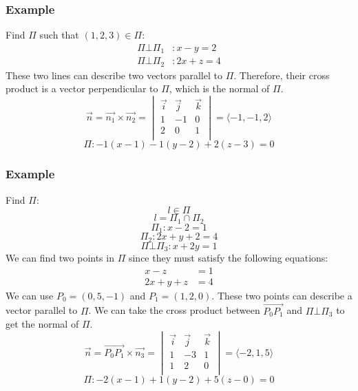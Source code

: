 \documentclass{math}
\begin{document}
\subsubsection*{Example}
Find \( \Pi \) such that \( (1,2,3)\in\Pi \):
\begin{align*}
  \Pi\bot\Pi_1&: x-y = 2 \\
  \Pi\bot\Pi_2&: 2x+z = 4
\end{align*}
These two lines can describe two vectors parallel to \( \Pi \). Therefore, their
cross product is a vector perpendicular to \( \Pi \), which is the normal of
\( \Pi \).
\[ \vec{n} = \vec{n_1}\times\vec{n_2} = \begin{vmatrix}
  \vec{i} & \vec{j} & \vec{k} \\
  1 & -1 & 0 \\
  2 & 0 & 1 \\
\end{vmatrix} = \langle-1,-1,2\rangle \]
\[ \Pi: -1(x-1)-1(y-2)+2(z-3) = 0 \]

\subsubsection*{Example}
Find \( \Pi \):
\[ l\in\Pi \]
\[ l = \Pi_1\cap\Pi_2 \]
\[ \Pi_1:x-2 = 1 \]
\[ \Pi_2:2x+y+2 = 4 \]
\[ \Pi\bot\Pi_3: x+2y = 1 \]
We can find two points in \( \Pi \) since they must satisfy the following
equations:
\begin{align*}
  x-z &= 1 \\
  2x+y+z &= 4
\end{align*}
We can use \( P_0 = (0,5,-1) \) and \( P_1 = (1,2,0) \). These two points can
describe a vector parallel to \( \Pi \). We can take the cross product between
\( \overrightarrow{P_0P_1} \) and \( \Pi\bot\Pi_3 \) to get the normal of
\( \Pi \).
\[ \vec{n} = \overrightarrow{P_0P_1}\times\vec{n_3} = \begin{vmatrix}
  \vec{i} & \vec{j} & \vec{k} \\
  1 & -3 & 1 \\
  1 & 2 & 0 \\
\end{vmatrix} = \langle-2,1,5\rangle \]
\[ \Pi: -2(x-1)+1(y-2)+5(z-0) = 0 \]
\end{document}
